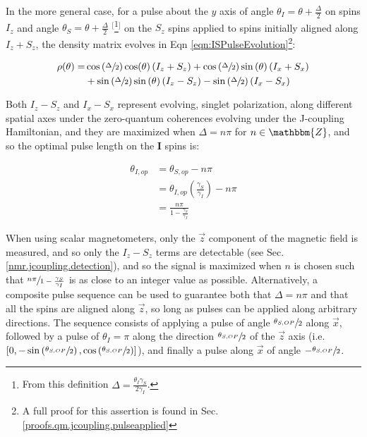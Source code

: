 \documentclass[PaulGanssle-Thesis.tex]{subfiles}
\begin{document}
In the more general case, for a pulse about the $y$ axis of angle $\theta_{I} = \theta + \frac{\Delta}{2}$ on spins $I_{z}$ and angle $\theta_{S} = \theta + \frac{\Delta}{2}$ $^{[}$\footnote{From this definition $\Delta = \frac{\theta_{I}\gamma_{S}}{2\gamma_{I}}$.}$^{]}$ on the $S_z$ spins applied to spins initially aligned along $I_{z} + S_{z}$, the density matrix evolves in Eqn \ref{eqn:ISPulseEvolution}\footnote{A full proof for this assertion is found in Sec. \ref{proofs.qm.jcoupling.pulseapplied}}:

\begin{align}
\label{eqn:ISPulseEvolution}
\rho(\theta) = &  \cos\left(\sfrac{\Delta}{2}\right)\cos(\theta)\left(I_{z} + S_{z}\right) + \cos\left(\sfrac{\Delta}{2}\right)\sin\left(\theta\right)\left(I_{x} + S_{x}\right)\\
& + \sin\left(\sfrac{\Delta}{2}\right)\sin\left(\theta\right)\left(I_{z} - S_{z}\right) - \sin\left(\sfrac{\Delta}{2}\right)\left(I_{x}-S_{x}\right)
\end{align}

Both $I_{z} - S_{z}$ and $I_{x} - S_{x}$ represent evolving, singlet polarization, along different spatial axes under the zero-quantum coherences evolving under the J-coupling Hamiltonian, and they are maximized when $\Delta = n\pi$ for  $n \in \mathbbm{Z}$, and so the optimal pulse length on the $\mathbf{I}$ spins is:

\begin{align}
\theta_{I,op} & = \theta_{S,op} - n\pi \nonumber\\ 
& = \theta_{I,op}\left(\frac{\gamma_{S}}{\gamma_{I}}\right) - n\pi\nonumber \\
\label{eqn:ISpinTipAngleOptima}
& = \frac{n\pi}{1-\frac{\gamma_{S}}{\gamma_{I}}}
\end{align}

When using scalar magnetometers, only the $\vec{z}$ component of the magnetic field is measured, and so only the $I_{z} - S_{z}$ terms are detectable (see Sec. \ref{nmr.jcoupling.detection}), and so the signal is maximized when $n$ is chosen such that $\sfrac{n\pi}{1-\frac{\gamma_{S}}{\gamma_{I}}}$ is as close to an integer value as possible. Alternatively, a composite pulse sequence can be used to guarantee both that $\Delta = n\pi$ and that all the spins are aligned along $\vec{z}$, so long as pulses can be applied along arbitrary directions. The sequence consists of applying a pulse of angle $\sfrac{\theta_{S,OP}}{2}$ along $\vec{x}$, followed by a pulse of $\theta_{I} = \pi$ along the direction $\sfrac{\theta_{S,OP}}{2}$ of the $\vec{z}$ axis (i.e. $\left[0, -\sin\left(\sfrac{\theta_{S,OP}}{2}\right), \cos\left(\sfrac{\theta_{S,OP}}{2}\right)\right]$), and finally a pulse along $\vec{x}$ of angle $-\sfrac{\theta_{S,OP}}{2}$.
\end{document}
